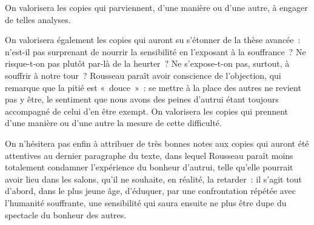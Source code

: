 {On valorisera les copies qui parviennent, d'une manière ou d'une autre, à engager de
telles analyses.

On valorisera également les copies qui auront su s'étonner de la thèse
avancée~: n'est-il pas surprenant de nourrir la sensibilité en l'exposant à la souffrance~?
Ne risque-t-on pas plutôt par-là de la heurter~? Ne s'expose-t-on pas, surtout, à souffrir
à notre tour~? Rousseau paraît avoir conscience de l'objection, qui remarque que la
pitié est «~douce~»~: se mettre à la place des autres ne revient pas y être, le sentiment
que nous avons des peines d'autrui étant toujours accompagné de celui d'en être
exempt. On valorisera les copies qui prennent d'une manière ou d'une autre la mesure
de cette difficulté.

On n'hésitera pas enfin à attribuer de très bonnes notes aux copies qui auront
été attentives au dernier paragraphe du texte, dans lequel Rousseau paraît moins
totalement condamner l'expérience du bonheur d'autrui, telle qu'elle pourrait avoir lieu
dans les salons, qu'il ne souhaite, en réalité, la retarder~: il s'agit tout d'abord, dans le
plus jeune âge, d'éduquer, par une confrontation répétée avec l'humanité souffrante,
une sensibilité qui saura ensuite ne plus être dupe du spectacle du bonheur des autres.}%
